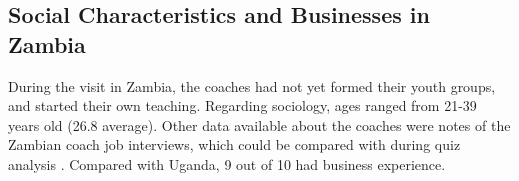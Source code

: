 \subsection{Social Characteristics and Businesses in Zambia}
During the visit in Zambia, the coaches had not yet formed their youth groups, and started their own teaching. Regarding sociology, ages ranged from 21-39 years old (26.8 average). Other data available about the coaches were notes of the Zambian coach job interviews, which could be compared with during quiz analysis \citep{yd-zambia-interviews}. Compared with Uganda, 9 out of 10 had business experience.





%

